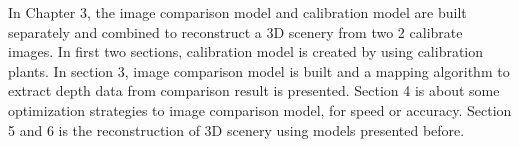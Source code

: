 In Chapter 3, the image comparison model and calibration model are built separately and combined to reconstruct a 3D scenery from two 2 calibrate images. In first two sections, calibration model is created by using calibration plants. In section 3, image comparison model is built and a mapping algorithm to extract depth data from comparison result is presented. Section 4 is about some optimization strategies to image comparison model, for speed or accuracy. Section 5 and 6 is the reconstruction of 3D scenery using models presented before. 

